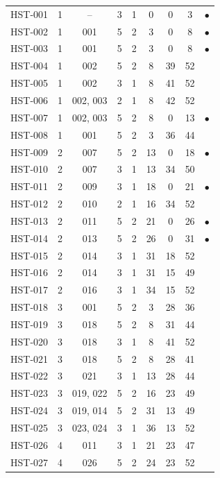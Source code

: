 \documentclass[11pt,a4paper,oneside]{report}
\begin{document}
\begin{longtable}{l c c c c c c c c}
HST-001 & 1 & --            & 3 & 1 & 0  & 0  & 3  & $\bullet$\\
HST-002 & 1 & 001           & 5 & 2 & 3  & 0  & 8  & $\bullet$\\
HST-003 & 1 & 001           & 5 & 2 & 3  & 0  & 8  & $\bullet$\\
HST-004 & 1 & 002           & 5 & 2 & 8  & 39 & 52 & \\
HST-005 & 1 & 002           & 3 & 1 & 8  & 41 & 52 & \\
HST-006 & 1 & 002, 003      & 2 & 1 & 8  & 42 & 52 & \\
HST-007 & 1 & 002, 003      & 5 & 2 & 8  & 0  & 13 & $\bullet$\\
HST-008 & 1 & 001           & 5 & 2 & 3  & 36 & 44 & \\
HST-009 & 2 & 007           & 5 & 2 & 13 & 0  & 18 & $\bullet$\\
HST-010 & 2 & 007           & 3 & 1 & 13 & 34 & 50 & \\
HST-011 & 2 & 009           & 3 & 1 & 18 & 0  & 21 & $\bullet$\\
HST-012 & 2 & 010           & 2 & 1 & 16 & 34 & 52 & \\
HST-013 & 2 & 011           & 5 & 2 & 21 & 0  & 26 & $\bullet$\\
HST-014 & 2 & 013           & 5 & 2 & 26 & 0  & 31 & $\bullet$\\
HST-015 & 2 & 014           & 3 & 1 & 31 & 18 & 52 & \\
HST-016 & 2 & 014           & 3 & 1 & 31 & 15 & 49 & \\
HST-017 & 2 & 016           & 3 & 1 & 34 & 15 & 52 & \\
HST-018 & 3 & 001           & 5 & 2 & 3  & 28 & 36 & \\
HST-019 & 3 & 018           & 5 & 2 & 8  & 31 & 44 & \\
HST-020 & 3 & 018           & 3 & 1 & 8  & 41 & 52 & \\
HST-021 & 3 & 018           & 5 & 2 & 8  & 28 & 41 & \\
HST-022 & 3 & 021           & 3 & 1 & 13 & 28 & 44 & \\
HST-023 & 3 & 019, 022      & 5 & 2 & 16 & 23 & 49 & \\
HST-024 & 3 & 019, 014      & 5 & 2 & 31 & 13 & 49 & \\
HST-025 & 3 & 023, 024      & 3 & 1 & 36 & 13 & 52 & \\
HST-026 & 4 & 011           & 3 & 1 & 21 & 23 & 47 & \\
HST-027 & 4 & 026           & 5 & 2 & 24 & 23 & 52 & \\

\end{longtable}
\end{document}
